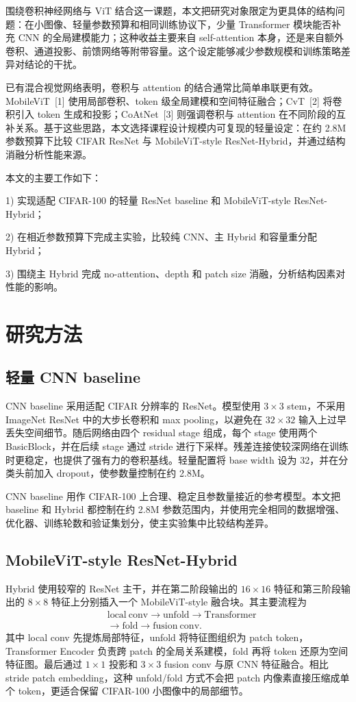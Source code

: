 \documentclass[UTF8,letterpaper,twocolumn]{ctexart}
\begin{document}
围绕卷积神经网络与 ViT 结合这一课题，本文把研究对象限定为更具体的结构问题：在小图像、轻量参数预算和相同训练协议下，少量 Transformer 模块能否补充 CNN 的全局建模能力；这种收益主要来自 self-attention 本身，还是来自额外卷积、通道投影、前馈网络等附带容量。这个设定能够减少参数规模和训练策略差异对结论的干扰。

已有混合视觉网络表明，卷积与 attention 的结合通常比简单串联更有效。MobileViT~[1] 使用局部卷积、token 级全局建模和空间特征融合；CvT~[2] 将卷积引入 token 生成和投影；CoAtNet~[3] 则强调卷积与 attention 在不同阶段的互补关系。基于这些思路，本文选择课程设计规模内可复现的轻量设定：在约 2.8M 参数预算下比较 CIFAR ResNet 与 MobileViT-style ResNet-Hybrid，并通过结构消融分析性能来源。

本文的主要工作如下：

1) 实现适配 CIFAR-100 的轻量 ResNet baseline 和 MobileViT-style ResNet-Hybrid；

2) 在相近参数预算下完成主实验，比较纯 CNN、主 Hybrid 和容量重分配 Hybrid；

3) 围绕主 Hybrid 完成 no-attention、depth 和 patch size 消融，分析结构因素对性能的影响。

\section{研究方法}
\subsection{轻量 CNN baseline}
CNN baseline 采用适配 CIFAR 分辨率的 ResNet。模型使用 $3\times3$ stem，不采用 ImageNet ResNet 中的大步长卷积和 max pooling，以避免在 $32\times32$ 输入上过早丢失空间细节。随后网络由四个 residual stage 组成，每个 stage 使用两个 BasicBlock，并在后续 stage 通过 stride 进行下采样。残差连接使较深网络在训练时更稳定，也提供了强有力的卷积基线。轻量配置将 base width 设为 32，并在分类头前加入 dropout，使参数量控制在约 2.8M。

CNN baseline 用作 CIFAR-100 上合理、稳定且参数量接近的参考模型。本文把 baseline 和 Hybrid 都控制在约 2.8M 参数范围内，并使用完全相同的数据增强、优化器、训练轮数和验证集划分，使主实验集中比较结构差异。

\subsection{MobileViT-style ResNet-Hybrid}
Hybrid 使用较窄的 ResNet 主干，并在第二阶段输出的 $16\times16$ 特征和第三阶段输出的 $8\times8$ 特征上分别插入一个 MobileViT-style 融合块。其主要流程为
\[
\begin{aligned}
&\mathrm{local\ conv}\rightarrow \mathrm{unfold}\rightarrow \mathrm{Transformer}\\
&\rightarrow \mathrm{fold}\rightarrow \mathrm{fusion\ conv}.
\end{aligned}
\]
其中 local conv 先提炼局部特征，unfold 将特征图组织为 patch token，Transformer Encoder 负责跨 patch 的全局关系建模，fold 再将 token 还原为空间特征图。最后通过 $1\times1$ 投影和 $3\times3$ fusion conv 与原 CNN 特征融合。相比 stride patch embedding，这种 unfold/fold 方式不会把 patch 内像素直接压缩成单个 token，更适合保留 CIFAR-100 小图像中的局部细节。
\end{document}
